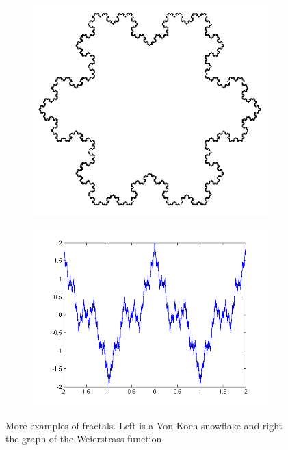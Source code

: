 \begin{figure}[h]
\begin{subfigure}{.5\textwidth}
  \centering
  \includegraphics[width=.8\linewidth]{pics/intro/vonKoch.png}
  \label{fig:sfig1}
\end{subfigure}%
\begin{subfigure}{.5\textwidth}
  \centering
  \includegraphics[width=.8\linewidth]{pics/intro/weierstrass.png}
  \label{fig:sfig2}
\end{subfigure}
\caption{More examples of fractals. Left is a Von Koch snowflake and right the graph of the Weierstrass function}
\label{fig:examples2}
\end{figure}



